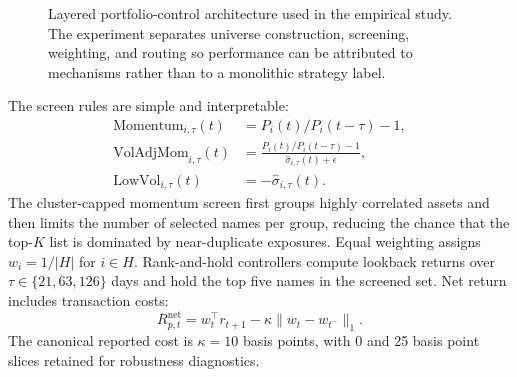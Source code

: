 \documentclass[11pt,a4paper]{article}
\begin{document}
\begin{figure}[H]
\centering
{}
\caption{Layered portfolio-control architecture used in the empirical study. The experiment separates universe construction, screening, weighting, and routing so performance can be attributed to mechanisms rather than to a monolithic strategy label.}
\label{fig:layered_architecture}
\end{figure}

The screen rules are simple and interpretable:
\begin{align}
\text{Momentum}_{i,\tau}(t) &= P_i(t)/P_i(t-\tau)-1,\\
\text{VolAdjMom}_{i,\tau}(t) &= \frac{P_i(t)/P_i(t-\tau)-1}{\widehat{\sigma}_{i,\tau}(t)+\epsilon},\\
\text{LowVol}_{i,\tau}(t) &= -\widehat{\sigma}_{i,\tau}(t).
\end{align}
The cluster-capped momentum screen first groups highly correlated assets and then limits the number of selected names per group, reducing the chance that the top-$K$ list is dominated by near-duplicate exposures. Equal weighting assigns $w_i=1/|H|$ for $i\in H$. Rank-and-hold controllers compute lookback returns over $\tau\in\{21,63,126\}$ days and hold the top five names in the screened set. Net return includes transaction costs:
\begin{equation}
R_{p,t}^{\text{net}} = w_t^\top r_{t+1} - \kappa \|w_t-w_{t^-}\|_1.
\end{equation}
The canonical reported cost is $\kappa=10$ basis points, with 0 and 25 basis point slices retained for robustness diagnostics.
\end{document}

